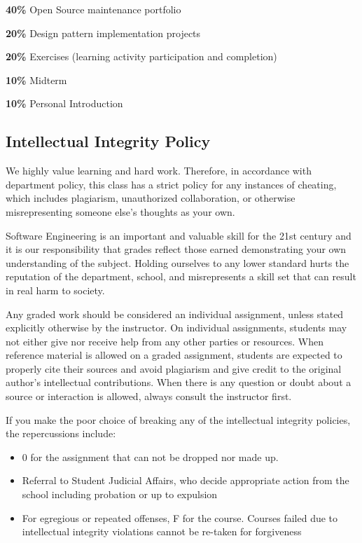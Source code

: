 \documentclass[12pt]{article}
\begin{document}
  \textbf{40\%} Open Source maintenance portfolio
  
  \textbf{20\%} Design pattern implementation projects
  
  \textbf{20\%} Exercises (learning activity participation and completion)

  \textbf{10\%} Midterm

  \textbf{10\%} Personal Introduction

  \subsection*{Intellectual Integrity Policy}

  We highly value learning and hard work. Therefore, in accordance with department policy, this class has a strict policy for any instances of cheating, which includes plagiarism, unauthorized collaboration, or otherwise misrepresenting someone else's thoughts as your own.

  Software Engineering is an important and valuable skill for the 21st century and it is our responsibility that grades reflect those earned demonstrating your own understanding of the subject. Holding ourselves to any lower standard hurts the reputation of the department, school, and misrepresents a skill set that can result in real harm to society.

  Any graded work should be considered an individual assignment, unless stated explicitly otherwise by the instructor. On individual assignments, students may not either give nor receive help from any other parties or resources. When reference material is allowed on a graded assignment, students are expected to properly cite their sources and avoid plagiarism and give credit to the original author's intellectual contributions. When there is any question or doubt about a source or interaction is allowed, always consult the instructor first.

  If you make the poor choice of breaking any of the intellectual integrity policies, the repercussions include:

  \begin{itemize}
    \item 0 for the assignment that can not be dropped nor made up. 
    \item Referral to Student Judicial Affairs, who decide appropriate action from the school including probation or up to expulsion
    \item For egregious or repeated offenses, F for the course. Courses failed due to intellectual integrity violations cannot be re-taken for forgiveness
  \end{itemize}
\end{document}
